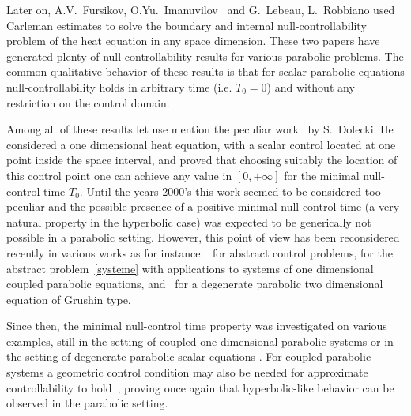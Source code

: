 \documentclass[11pt]{article}
\theoremstyle{definition}
\numberwithin{equation}{section}
\numberwithin{figure}{section}
\numberwithin{table}{section}
\begin{document}
Later on, A.V.~Fursikov, O.Yu.~Imanuvilov~\cite{FursikovImanuvilov96} and G.~Lebeau, L.~Robbiano \cite{LebeauRobbiano95} used Carleman estimates to solve the boundary and internal null-controllab\-ility problem of the heat equation in any space dimension. These two papers have generated plenty of null-controllability results for various parabolic problems. The common qualitative behavior of these results is that for scalar parabolic equations null-controllability holds in arbitrary time (i.e. $T_0 = 0$) and without any restriction on the control domain.

Among all of these results let use mention the peculiar work~\cite{Dolecki73} by S.~Dolecki. He considered a one dimensional heat equation, with a scalar control located at one point inside the space interval, and proved that choosing suitably the location of this control point one can achieve any value in $[0,+\infty]$ for the minimal null-control time $T_0$. Until the years 2000's this work seemed to be considered too peculiar and the possible presence of a positive minimal null-control time (a very natural property in the hyperbolic case) was expected to be generically not possible in a parabolic setting. However, this point of view has been reconsidered recently in various works as for instance:~\cite{AKBDK05} for abstract control problems, \cite{AmmarKhodjaBenabdallahGonzalez-BurgosdeTeresa:2014} for the abstract problem~\eqref{systeme} with applications to systems of one dimensional coupled parabolic equations, and~\cite{BeauchardCannarsaGuglielmi} for a degenerate parabolic two dimensional equation of Grushin type.

Since then, the minimal null-control time property was investigated on various examples, still in the setting of coupled one dimensional parabolic systems \cite{AKBGBdT_JMAA16,Duprez_Tmin2017,Ouaili18,Samb18} or in the setting of degenerate parabolic scalar equations \cite{BeauchardCannarsa17, BeauchardDardeErvedoza, BHHR_Kolmogorov, BeauchardMillerMorancey_Tmin, DuprezKoenig}. For coupled parabolic systems a geometric control condition may also be needed for approximate controllability to hold~\cite{BoyerOlive14, Olive13}, proving once again that hyperbolic-like behavior can be observed in the parabolic setting.
\end{document}
